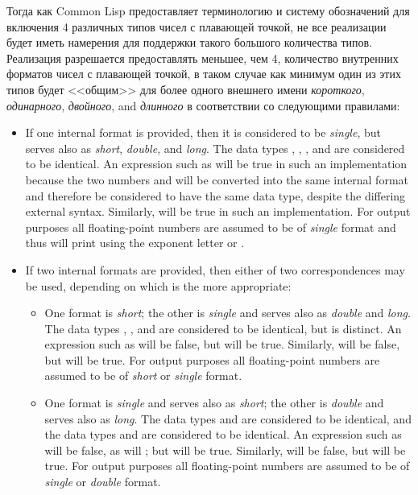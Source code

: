 Тогда как Common Lisp предоставляет терминологию и систему обозначений для
включения 4 различных типов чисел с плавающей точкой, не все реализации будет
иметь намерения для поддержки такого большого количества типов.
Реализация разрешается предоставлять меньшее, чем 4, количество внутренних
форматов чисел с плавающей точкой, в таком случае как минимум один из этих типов
будет <<общим>> для более одного внешнего имени \emph{короткого}, \emph{одинарного},
\emph{двойного}, and \emph{длинного} в соответствии со следующими правилами:
\begin{itemize}
\item
If one internal format is provided, then it is considered to be
\emph{single}, but serves also as \emph{short}, \emph{double}, and \emph{long}.
The data types ,
, , and  are
considered to be identical.  An expression such as 
will be true in such an implementation
because the two numbers  and  will
be converted into the same internal format and therefore be considered
to have the same data type, despite the differing external syntax.
Similarly,  will be true in such
an implementation.
For output purposes all floating-point numbers are assumed to be
of \emph{single} format and thus will print using the
exponent letter  or .

\item
If two internal formats are provided, then either of two correspondences
may be used, depending on which is the more appropriate:
\begin{itemize}
\item
One format is \emph{short}; the other is \emph{single} and serves also
as \emph{double} and \emph{long}.
The data types
, , and  are
considered to be identical, but  is distinct.
An expression such as 
will be false, but  will be true.
Similarly,  will be false,
but  will be true.
For output purposes all floating-point numbers are assumed to be
of \emph{short} or \emph{single} format.

\item
One format is \emph{single} and serves also as \emph{short};
the other is \emph{double} and serves also as \emph{long}.
The data types  and  are considered to be
identical, and the data types  and  are
considered to be identical.
An expression such as 
will be false, as will ;
but  will be true.
Similarly,  will be false,
but  will be true.
For output purposes all floating-point numbers are assumed to be
of \emph{single} or \emph{double} format.
\end{itemize}


\end{itemize}
